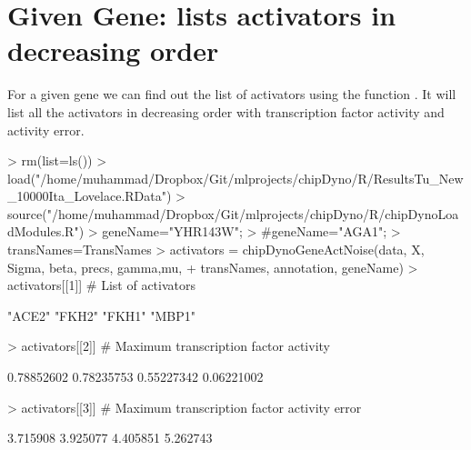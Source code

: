 \documentclass{article}
\begin{document}
\section{Given Gene: lists activators in decreasing order}
For a given gene we can find out the list of activators using the function . It will list all the activators in decreasing order with transcription factor activity and activity error.


\begin{Schunk}
\begin{Sinput}
> rm(list=ls())
> load("/home/muhammad/Dropbox/Git/mlprojects/chipDyno/R/ResultsTu_New_10000Ita_Lovelace.RData")
> source("/home/muhammad/Dropbox/Git/mlprojects/chipDyno/R/chipDynoLoadModules.R")
> geneName="YHR143W"; 
> #geneName="AGA1"; 
> transNames=TransNames
> activators = chipDynoGeneActNoise(data, X, Sigma, beta, precs, gamma,mu, 
+                     transNames, annotation, geneName)
> activators[[1]] # List of activators
\end{Sinput}
\begin{Soutput}
[1] "ACE2" "FKH2" "FKH1" "MBP1"
\end{Soutput}
\begin{Sinput}
> activators[[2]] # Maximum transcription factor activity
\end{Sinput}
\begin{Soutput}
[1] 0.78852602 0.78235753 0.55227342 0.06221002
\end{Soutput}
\begin{Sinput}
> activators[[3]] # Maximum transcription factor activity error
\end{Sinput}
\begin{Soutput}
[1] 3.715908 3.925077 4.405851 5.262743
\end{Soutput}
\end{Schunk}



\end{document}
